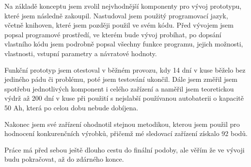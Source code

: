 \documentclass[FM,BP]{tulthesis}  %
\begin{document}
Na základě konceptu jsem zvolil nejvhodnější komponenty pro vývoj prototypu, které jsem následně zakoupil. Nastudoval jsem použitý programovací jazyk, včetně knihoven, které jsem později použil ve svém kódu. Před vývojem jsem popsal programové prostředí, ve kterém bude vývoj probíhat, po dopsání vlastního kódu jsem podrobně popsal všechny funkce programu, jejich možnosti, vlastnosti, vstupní parametry a návratové hodnoty. 

Funkční prototyp jsem otestoval v běžném provozu, kdy 14 dní v kuse běželo bez jediného pádu či problému, poté jsem testování ukončil. Dále jsem změřil jsem spotřebu jednotlivých komponent i celého zařízení a naměřil jsem teoretickou výdrž až 200 dní v kuse při použití s nejslabší používanou autobaterii o kapacitě 50 Ah, která po celou dobu nebude dobíjena.

Nakonec jsem své zařízení ohodnotil stejnou metodikou, kterou jsem použil pro hodnocení konkurenčních výrobků, přičemž mé sledovací zařízení získalo 92 bodů.

Práce má před sebou ještě dlouho cestu do finální podoby, ale věřím že ve vývoji budu pokračovat, až do zdárného konce.
\end{document}

